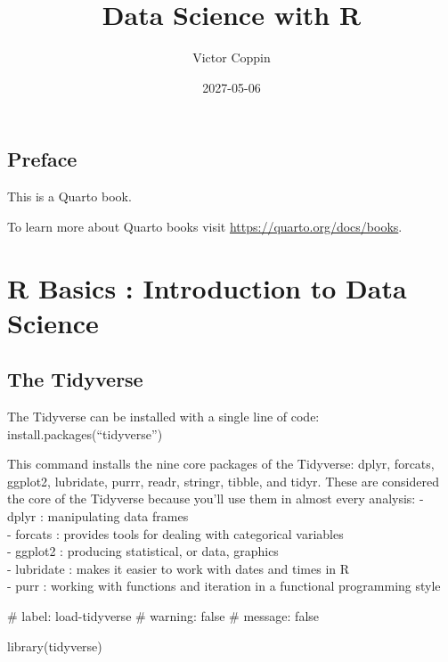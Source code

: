 \documentclass[
  letterpaper,
  DIV=11,
  numbers=noendperiod]{scrreprt}
\title{Data Science with R}
\author{Victor Coppin}
\date{2027-05-06}
\newenvironment{Shaded}{\begin{snugshade}}{\end{snugshade}}
\newcommand{\FunctionTok}[1]{\textcolor[rgb]{0.28,0.35,0.67}{#1}}
\newcommand{\NormalTok}[1]{\textcolor[rgb]{0.00,0.23,0.31}{#1}}
\renewcommand*\contentsname{Table of contents}
\newcommand\contentsname{Table of contents}
\begin{document}
\maketitle

\renewcommand*\contentsname{Table of contents}
{
\hypersetup{linkcolor=}
\setcounter{tocdepth}{2}
\tableofcontents
}


\chapter*{Preface}\label{preface}


This is a Quarto book.

To learn more about Quarto books visit
\url{https://quarto.org/docs/books}.

\part{R Basics : Introduction to Data Science}

\chapter{The Tidyverse}\label{the-tidyverse}

The Tidyverse can be installed with a single line of code:
install.packages(``tidyverse'')

This command installs the nine core packages of the Tidyverse: dplyr,
forcats, ggplot2, lubridate, purrr, readr, stringr, tibble, and tidyr.
These are considered the core of the Tidyverse because you'll use them
in almost every analysis: - dplyr : manipulating data frames\\
- forcats : provides tools for dealing with categorical variables\\
- ggplot2 : producing statistical, or data, graphics\\
- lubridate : makes it easier to work with dates and times in R\\
- purr : working with functions and iteration in a functional
programming style

\#\textbar{} label: load-tidyverse \#\textbar{} warning: false
\#\textbar{} message: false

\begin{Shaded}
\begin{Highlighting}[]
\FunctionTok{library}\NormalTok{(tidyverse)}
\end{Highlighting}
\end{Shaded}
\end{document}
